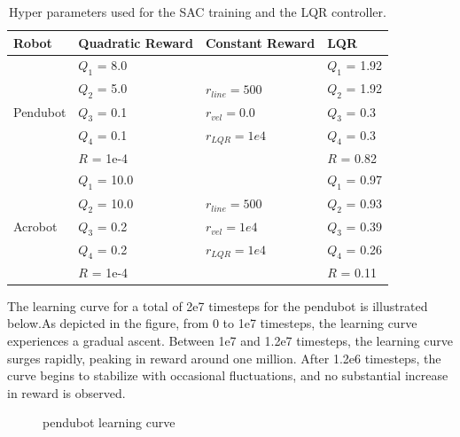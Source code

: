 \begin{table}[H]
  \centering
  \begin{tabular}{p{2cm} | p{3cm} | p{3cm} | p{3cm}}
  Robot & Quadratic Reward  & Constant Reward & LQR\\
  \hline
  \multirow{5}{*}{Pendubot} & \(Q_1\) = 8.0  &  & \(Q_1\) = 1.92\\
  & \(Q_2\) = 5.0  & \(r_{line}=500\) & \(Q_2\) = 1.92\\
  & \(Q_3\) = 0.1  & \(r_{vel}=0.0\) & \(Q_3\) = 0.3\\
  & \(Q_4\) = 0.1  & \(r_{LQR}=1e4\)& \(Q_4\) = 0.3\\
  & \(R\) = 1e-4  & & \(R\) = 0.82\\
  \hline
  \multirow{5}{*}{Acrobot} & \(Q_1\) = 10.0  &  & \(Q_1\) = 0.97\\
  & \(Q_2\) = 10.0  & \(r_{line}=500\) & \(Q_2\) = 0.93\\
  & \(Q_3\) = 0.2  & \(r_{vel}=1e4\) & \(Q_3\) = 0.39\\
  & \(Q_4\) = 0.2  & \(r_{LQR}=1e4\) & \(Q_4\) = 0.26\\
  & \(R\) = 1e-4  &  & \(R\) = 0.11\\
  \end{tabular}
 \caption{Hyper parameters used for the SAC training and the LQR controller.}
 \label{tab:parameters}
\end{table}

The learning curve for a total of 2e7 timesteps for the pendubot is illustrated below.As depicted in the figure, from 0 to 1e7 timesteps, the learning curve experiences a gradual ascent. Between 1e7 and 1.2e7 timesteps, the learning curve surges rapidly, peaking in reward around one million. After 1.2e6 timesteps, the curve begins to stabilize with occasional fluctuations, and no substantial increase in reward is observed.

\begin{figure}[H]
    \centering
    \caption{pendubot learning curve}
    \label{fig:image_a}
\end{figure}


